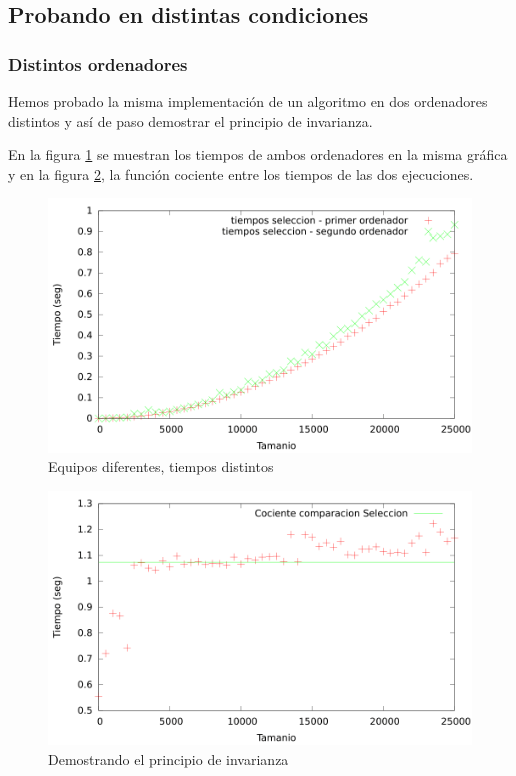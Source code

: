 \documentclass{article}
\begin{document}
	

\subsection{Probando en distintas condiciones}
\subsubsection{Distintos ordenadores}
Hemos probado la misma implementación de un algoritmo en dos ordenadores distintos y así de paso demostrar el principio de invarianza.
\

En la figura \ref{fig:compSeleccion} se muestran los tiempos de ambos ordenadores en la misma gráfica y en la figura \ref{fig:compSeleccion_cociente}, la función cociente entre los tiempos de las dos ejecuciones.
\begin{figure}[H]
	\centering
	\includegraphics[totalheight=8cm]{img/compSeleccion}
	\caption{Equipos diferentes, tiempos distintos}
	\label{fig:compSeleccion}
\end{figure}
\begin{figure}[H]
	\centering
	\includegraphics[totalheight=8cm]{img/compSeleccion_cociente}
	\caption{Demostrando el principio de invarianza}
	\label{fig:compSeleccion_cociente}
\end{figure}
\end{document}
